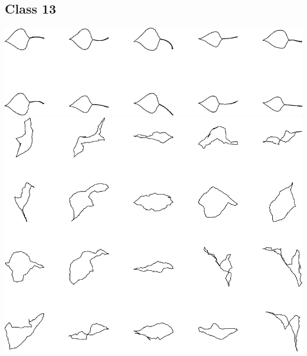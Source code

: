 \documentclass{book}
\begin{document}
\subsection{Class 13}
\includegraphics[width=6in]{output/3.learning/scaled_nts/scaled_nts_training_13.png}
\includegraphics[width=6in]{output/3.learning/scaled_nts/scaled_nts_13.png}
\end{document}
